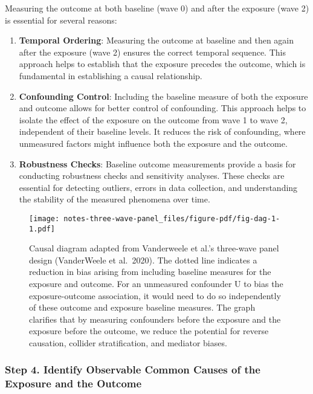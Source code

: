 \documentclass[
  singlecolumn,
  9pt]{article}
\begin{document}
Measuring the outcome at both baseline (wave 0) and after the exposure
(wave 2) is essential for several reasons:

\begin{enumerate}
\def\labelenumi{\arabic{enumi}.}
\item
  \textbf{Temporal Ordering}: Measuring the outcome at baseline and then
  again after the exposure (wave 2) ensures the correct temporal
  sequence. This approach helps to establish that the exposure precedes
  the outcome, which is fundamental in establishing a causal
  relationship.
\item
  \textbf{Confounding Control}: Including the baseline measure of both
  the exposure and outcome allows for better control of confounding.
  This approach helps to isolate the effect of the exposure on the
  outcome from wave 1 to wave 2, independent of their baseline levels.
  It reduces the risk of confounding, where unmeasured factors might
  influence both the exposure and the outcome.
\item
  \textbf{Robustness Checks}: Baseline outcome measurements provide a
  basis for conducting robustness checks and sensitivity analyses. These
  checks are essential for detecting outliers, errors in data
  collection, and understanding the stability of the measured phenomena
  over time.
\end{enumerate}

\begin{figure}

{\centering \texttt{[image: notes-three-wave-panel\_files/figure-pdf/fig-dag-1-1.pdf]}

}

\caption{\label{fig-dag-1}Causal diagram adapted from Vanderweele et
al.'s three-wave panel design (VanderWeele et al.~2020). The dotted line
indicates a reduction in bias arising from including baseline measures
for the exposure and outcome. For an unmeasured confounder U to bias the
exposure-outcome association, it would need to do so independently of
these outcome and exposure baseline measures. The graph clarifies that
by measuring confounders before the exposure and the exposure before the
outcome, we reduce the potential for reverse causation, collider
stratification, and mediator biases.}

\end{figure}

\subsubsection{Step 4. Identify Observable Common Causes of the Exposure
and the
Outcome}\label{step-4.-identify-observable-common-causes-of-the-exposure-and-the-outcome}
\end{document}
